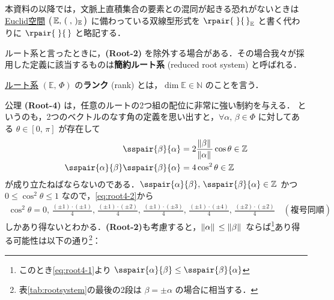 \documentclass[rep_main]{subfiles}
\begin{document}
\begin{marker}
	本資料の以降では，文脈上直積集合の要素との混同が起きる恐れがないときは\hyperref[def:Euclid-space]{Euclid空間} $\bigl(\, \mathbb{E},\, (\;,\,)_{\mathbb{E}}\,\bigr)$ に備わっている双線型形式を $\rpair{\;}{\,}_{\mathbb{E}}$ と書く代わりに $\rpair{\;}{\,}$ と略記する．
\end{marker}


ルート系と言ったときに，\textsf{\textbf{(Root-2)}} を除外する場合がある．その場合我々が採用した定義に該当するものは\textbf{簡約ルート系} (reduced root system) と呼ばれる．

\begin{mydef}[label=def:rank-root]{}
	\hyperref[ax:root-system]{ルート系} $(\mathbb{E},\, \Phi)$ の\textbf{ランク} (rank) とは，$\dim \mathbb{E} \in \mathbb{N}$ のことを言う．
\end{mydef}

公理 \textsf{\textbf{(Root-4)}} は，任意のルートの2つ組の配位に非常に強い制約を与える．
というのも，2つのベクトルのなす角の定義を思い出すと，$\forall \alpha,\, \beta \in \Phi$ に対してある $\theta \in [0,\, \pi]$ が存在して
\begin{align}
	\sspair{\beta}{\alpha} 
	&= 2 \frac{\norm*{\beta}}{\norm*{\alpha}} \cos \theta \in \mathbb{Z} \label{eq:root4-1} \\
	\sspair{\alpha}{\beta}\sspair{\beta}{\alpha} 
	&= 4 \cos^2 \theta \in \mathbb{Z} \label{eq:root4-2}
\end{align}
が成り立たねばならないのである．$\sspair{\alpha}{\beta},\,\sspair{\beta}{\alpha} \in \mathbb{Z}$ かつ $0 \le \cos^2 \theta \le 1$ なので，\eqref{eq:root4-2}から
\begin{align}
	\cos^2 \theta = 0,\, \frac{(\pm 1) \cdot (\pm 1)}{4},\, \frac{(\pm 1) \cdot (\pm 2)}{4},\, \frac{(\pm 1) \cdot (\pm 3)}{4},\, \frac{ (\pm 1) \cdot (\pm 4)}{4},\, \frac{(\pm 2) \cdot (\pm 2)}{4} \quad (\text{複号同順})
\end{align}
しかあり得ないとわかる．\textsf{\textbf{(Root-2)}}も考慮すると，$\norm*{\alpha} \le \norm*{\beta}$ ならば\footnote{このとき\eqref{eq:root4-1}より $\sspair{\alpha}{\beta} \le \sspair{\beta}{\alpha}$}あり得る可能性は以下の通り\footnote{表\ref{tab:rootsystem}の最後の2段は $\beta = \pm \alpha$ の場合に相当する．}：
\end{document}
